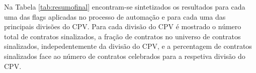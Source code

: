 \begin{table}[ht]
	\centering
	\renewcommand{\arraystretch}{1.5}
	\setlength{\tabcolsep}{15pt}
	\caption{Número de contratos, com um número variável de flags ativadas em simultâneo, sinalizados.}
	\label{final12}
\end{table}


Na Tabela \ref{tab:resumofinal} encontram-se sintetizados os resultados para cada uma das flags aplicadas no processo de automação e para cada uma das principais divisões do CPV. Para cada divisão do CPV é mostrado o número total de contratos sinalizados, a fração de contratos no universo de contratos sinalizados, indepedentemente da divisão do CPV, e a percentagem de contratos sinalizados face ao número de contratos celebrados para a respetiva divisão do CPV.




